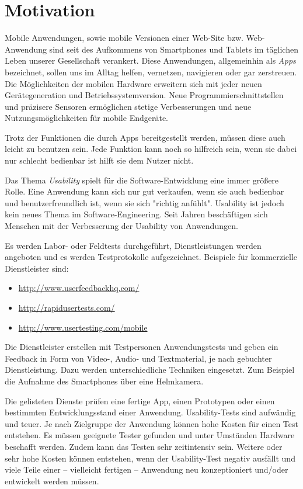 \section{Motivation}
\label{motivation}

Mobile Anwendungen, sowie mobile Versionen einer Web-Site bzw. Web-Anwendung sind seit des Aufkommens von Smartphones und Tablets im täglichen Leben unserer Gesellschaft verankert. 
Diese Anwendungen, allgemeinhin als \textit{Apps} bezeichnet, sollen uns im Alltag helfen, vernetzen, navigieren oder gar zerstreuen. 
Die Möglichkeiten der mobilen Hardware erweitern sich mit jeder neuen Gerätegeneration und Betriebssystemversion. 
Neue Programmierschnittstellen und präzisere Sensoren ermöglichen stetige Verbesserungen und neue Nutzungsmöglichkeiten für mobile Endgeräte. 

Trotz der Funktionen die durch Apps bereitgestellt werden, müssen diese auch leicht zu benutzen sein. 
Jede Funktion kann noch so hilfreich sein, wenn sie dabei nur schlecht bedienbar ist hilft sie dem Nutzer nicht.

Das Thema \textit{Usability} spielt für die Software-Entwicklung eine immer größere Rolle. 
Eine Anwendung kann sich nur gut verkaufen, wenn sie auch bedienbar und benutzerfreundlich ist, wenn sie sich "richtig anfühlt". 
Usability ist jedoch kein neues Thema im Software-Engineering.
Seit Jahren beschäftigen sich Menschen mit der Verbesserung der Usability von Anwendungen.

Es werden Labor- oder Feldtests durchgeführt, Dienstleistungen werden angeboten und es werden Testprotokolle aufgezeichnet. Beispiele für kommerzielle Dienstleister sind: 

\begin{itemize}
    \item{\url{http://www.userfeedbackhq.com/}}
    \item{\url{http://rapidusertests.com/}}
    \item{\url{http://www.usertesting.com/mobile}}
\end{itemize}

Die Dienstleister erstellen mit Testpersonen Anwendungstests und geben ein Feedback in Form von Video-, Audio- und Textmaterial, je nach gebuchter Dienstleistung. 
Dazu werden unterschiedliche Techniken eingesetzt. 
Zum Beispiel die Aufnahme des Smartphones über eine Helmkamera. 

Die gelisteten Dienste prüfen eine fertige App, einen Prototypen oder einen bestimmten Entwicklungsstand einer Anwendung. 
Usability-Tests sind aufwändig und teuer. 
Je nach Zielgruppe der Anwendung können hohe Kosten für einen Test entstehen. 
Es müssen geeignete Tester gefunden und unter Umständen Hardware beschafft werden. 
Zudem kann das Testen sehr zeitintensiv sein. 
Weitere oder sehr hohe Kosten können entstehen, wenn der Usability-Test negativ ausfällt und viele Teile einer -- vielleicht fertigen -- Anwendung neu konzeptioniert und/oder entwickelt werden müssen. 


